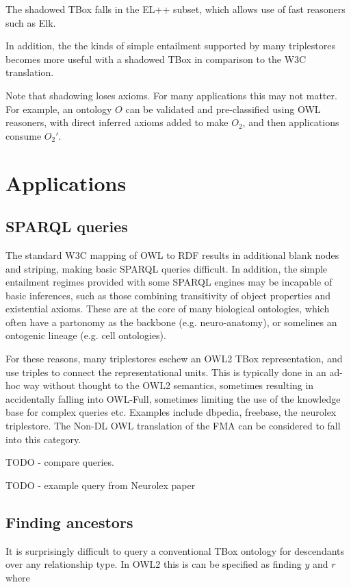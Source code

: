 \documentclass{my}
\begin{document}
The shadowed TBox falls in the EL++ subset, which allows use of fast
reasoners such as Elk.

In addition, the the kinds of simple entailment supported by many
triplestores becomes more useful with a shadowed TBox in comparison to
the W3C translation.

Note that shadowing loses axioms. For many applications this may not
matter. For example, an ontology $O$ can be validated and
pre-classified using OWL reasoners, with direct inferred axioms added
to make $O_2$, and then applications consume $O_2'$.

\section{Applications}

\subsection{SPARQL queries}

The standard W3C mapping of OWL to RDF results in additional blank
nodes and striping, making basic SPARQL queries difficult. In
addition, the simple entailment regimes provided with some SPARQL
engines may be incapable of basic inferences, such as those combining
transitivity of object properties and existential axioms. These are at
the core of many biological ontologies, which often have a partonomy
as the backbone (e.g. neuro-anatomy), or somelines an ontogenic
lineage (e.g. cell ontologies).

For these reasons, many triplestores eschew an OWL2 TBox
representation, and use triples to connect the representational
units. This is typically done in an ad-hoc way without thought to the
OWL2 semantics, sometimes resulting in accidentally falling into
OWL-Full, sometimes limiting the use of the knowledge base for complex
queries etc. Examples include dbpedia, freebase, the neurolex
triplestore. The Non-DL OWL translation of the FMA can be considered
to fall into this category.

TODO - compare queries.

TODO - example query from Neurolex paper

\subsection{Finding ancestors}

It is surprisingly difficult to query a conventional TBox ontology for
descendants over any relationship type. In OWL2 this is can be
specified as finding $y$ and $r$ where
\end{document}

